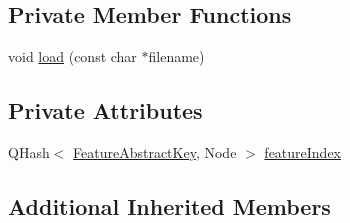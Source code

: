 \subsection*{Private Member Functions}
\begin{DoxyCompactItemize}
\item 
void \hyperlink{class_features_complex_network_ade08f031abd3843ca83e9b29ee138a43}{load} (const char $\ast$filename)
\end{DoxyCompactItemize}
\subsection*{Private Attributes}
\begin{DoxyCompactItemize}
\item 
Q\+Hash$<$ \hyperlink{class_feature_abstract_key}{Feature\+Abstract\+Key}, Node $>$ \hyperlink{class_features_complex_network_a7564b04733dffbb9176281c6d87722da}{feature\+Index}
\end{DoxyCompactItemize}
\subsection*{Additional Inherited Members}


